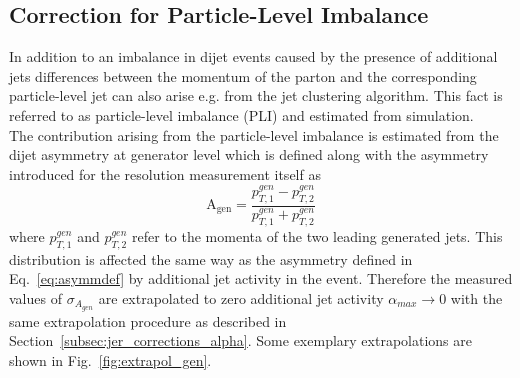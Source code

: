 \subsection{Correction for Particle-Level Imbalance}
\label{subsec:jer_corrections_pli}
In addition to an imbalance in dijet events caused by the presence of additional jets differences between the momentum of the parton and the corresponding particle-level jet can also arise e.g. from the jet clustering algorithm. This fact is referred to as particle-level imbalance (PLI) and estimated from simulation. \\
The contribution arising from the particle-level imbalance is estimated from the dijet asymmetry at generator level which is defined along with the asymmetry introduced for the resolution measurement itself as
\begin{equation}
  \mathrm{A_{gen}} = \frac{p_{T,1}^{gen} - p_{T,2}^{gen}}{p_{T,1}^{gen} + p_{T,2}^{gen}} 
 \end{equation}
where $p_{T,1}^{gen}$ and $p_{T,2}^{gen}$ refer to the momenta of the two leading generated jets. This distribution is affected the same way as the asymmetry defined in Eq.~\ref{eq:asymmdef} by additional jet activity in the event. Therefore the measured values of $\sigma_{A_{gen}}$ are extrapolated to zero additional jet activity $\alpha_{max} \rightarrow 0$ with the same extrapolation procedure as described in Section~\ref{subsec:jer_corrections_alpha}. Some exemplary extrapolations are shown in Fig.~\ref{fig:extrapol_gen}. \\
